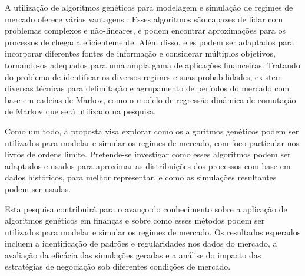 A utilização de algoritmos genéticos para modelagem e simulação de regimes de mercado oferece várias vantagens \cite{goldberg1989genetic, mitchell1996introduction}. Esses algoritmos são capazes de lidar com problemas complexos e não-lineares, e podem encontrar aproximações para os processos de chegada eficientemente. Além disso, eles podem ser adaptados para incorporar diferentes fontes de informação e considerar múltiplos objetivos, tornando-os adequados para uma ampla gama de aplicações financeiras. Tratando do problema de identificar os diversos regimes e suas probabilidades, existem diversas técnicas para delimitação e agrupamento de períodos do mercado com base em cadeias de Markov, como o modelo de regressão dinâmica de comutação de Markov que será utilizado na pesquisa\cite{cont2004financial}.

Como um todo, a proposta visa explorar como os algoritmos genéticos podem ser utilizados para modelar e simular os regimes de mercado, com foco particular nos livros de ordens limite. Pretende-se investigar como esses algoritmos podem ser adaptados e usados para aproximar as distribuições dos processos com base em dados históricos, para melhor representar, e como as simulações resultantes podem ser usadas.

Esta pesquisa contribuirá para o avanço do conhecimento sobre a aplicação de algoritmos genéticos em finanças e sobre como esses métodos podem ser utilizados para modelar e simular os regimes de mercado. Os resultados esperados incluem a identificação de padrões e regularidades nos dados do mercado, a avaliação da eficácia das simulações geradas e a análise do impacto das estratégias de negociação sob diferentes condições de mercado.